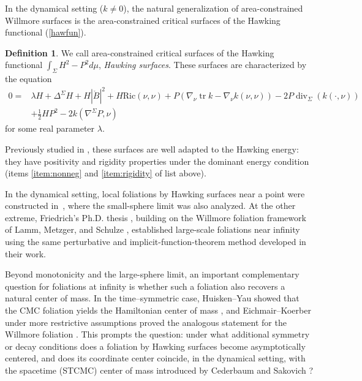 \documentclass[12pt,a4paper]{amsart}
\theoremstyle{plain}
\theoremstyle{definition}
\newtheorem{definition}[theorem]{Definition}
\newcommand{\diver}{\operatorname{div}}
\newcommand{\tr}{\operatorname{tr}}
\begin{document}
In the dynamical setting ($k\neq 0$), the natural generalization of area-constrained Willmore surfaces is the area-constrained critical surfaces of the Hawking functional (\ref{hawfun}).   
\begin{definition}
We call area-constrained critical surfaces of the Hawking functional $ \int_\Sigma H^2 -P^2 d\mu$, \emph{Hawking surfaces}. These surfaces are characterized by the equation 
 \begin{equation}\label{eulag}
\begin{split}
   0=& \lambda H  +\Delta^\Sigma H + H|\mathring{B}|^2+ H \mathrm{Ric}(\nu, \nu)+P( \nabla_\nu \tr k - \nabla_\nu k(\nu,\nu )) - 2P \diver_\Sigma (k(\cdot, \nu))\\ & +\frac{1}{2}H P^2 - 2k (\nabla^\Sigma P, \nu )
    \end{split}
\end{equation}
for some real parameter $\lambda$.
\end{definition}
Previously studied in \cite{Alex, diaz2023local, rigidiaz}, these surfaces are well adapted to the Hawking energy: they have positivity and rigidity properties under the dominant energy condition \cite{rigidiaz} (items \ref{item:nonneg} and \ref{item:rigidity} of list above). 


In the dynamical setting, local foliations by Hawking surfaces near a point were constructed in~\cite{diaz2023local}, where the small-sphere limit was also analyzed. At the other extreme, Friedrich’s Ph.D. thesis \cite{Friedrich2020}, building on the Willmore foliation framework of Lamm, Metzger, and Schulze \cite{willflat}, established large-scale foliations near infinity using the same perturbative and implicit-function-theorem method developed in their work.


Beyond monotonicity and the large-sphere limit, an important complementary question for foliations at infinity is whether such a foliation also recovers a natural center of mass. In the time–symmetric case, Huisken–Yau showed that the CMC foliation yields the Hamiltonian center of mass \cite{HY}, and Eichmair–Koerber under more restrictive assumptions proved the analogous statement for the Willmore foliation \cite{willcen}. This prompts the question: under what additional symmetry or decay conditions does a foliation by Hawking surfaces become asymptotically centered, and does its coordinate center coincide, in the dynamical setting, with the spacetime  (STCMC) center of mass introduced by Cederbaum and Sakovich \cite{STCMC}?
\end{document}
